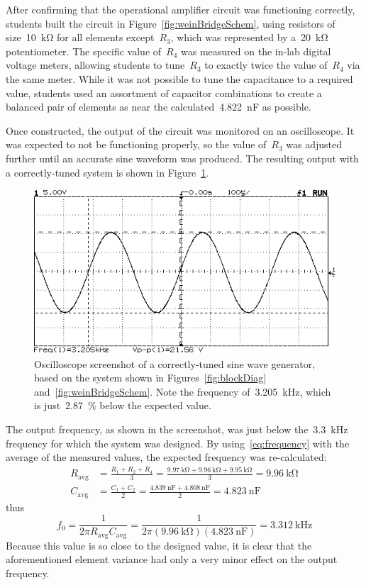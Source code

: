 After confirming that the operational amplifier circuit was functioning
correctly, students built the circuit in Figure~\ref{fig:weinBridgeSchem},
using resistors of size~\SI{10}{\kilo\ohm} for all elements except~$R_3$, which
was represented by a~\SI{20}{\kilo\ohm} potentiometer.  The specific value
of~$R_4$ was measured on the in-lab digital voltage meters, allowing students
to tune~$R_3$ to exactly twice the value of~$R_4$ via the same meter.  While it
was not possible to tune the capacitance to a required value, students used an
assortment of capacitor combinations to create a balanced pair of elements as
near the calculated~\SI{4.822}{\nano\farad} as possible.

Once constructed, the output of the circuit was monitored on an oscilloscope.
It was expected to not be functioning properly, so the value of~$R_3$ was
adjusted further until an accurate sine waveform was produced.  The resulting
output with a correctly-tuned system is shown in Figure~\ref{fig:goodShot}.
%
\begin{figure}[H]
	\centering
	\includegraphics[width=.6\textwidth]{img/shot/pt2shot.png}
	\parbox{.6\textwidth}{
	\caption[Oscilloscope Screenshot --- Functioning System]{Oscilloscope
	screenshot of a correctly-tuned sine wave generator, based on the system
	shown in Figures~\ref{fig:blockDiag} and~\ref{fig:weinBridgeSchem}.  Note
	the frequency of~\SI{3.205}{\kilo\hertz}, which is just~\SI{2.87}{\percent}
	below the expected value.}
	\label{fig:goodShot}}
\end{figure}
%
The output frequency, as shown in the screenshot, was just below
the~\SI{3.3}{\kilo\hertz} frequency for which the system was designed.  By
using~\eqref{eq:frequency} with the average of the measured values, the
expected frequency was re-calculated:
%
\begin{align*}
	R_\text{avg} &= \frac{R_1 + R_2 + R_4}{3}
	             = \frac{\SI{9.97}{\kilo\ohm} + \SI{9.96}{\kilo\ohm} + \SI{9.95}{\kilo\ohm}}{3}
				 = \SI{9.96}{\kilo\ohm}\\
	C_\text{avg} &= \frac{C_1 + C_2}{2}
				 = \frac{\SI{4.839}{\nano\farad} + \SI{4.808}{\nano\farad}}{2}
				 = \SI{4.823}{\nano\farad}
\end{align*}
thus
\begin{equation*}
	f_0 = \frac{1}{2 \pi R_\text{avg} C_\text{avg}}
		= \frac{1}{2 \pi (\SI{9.96}{\kilo\ohm}) (\SI{4.823}{\nano\farad})}
		= \SI{3.312}{\kilo\hertz}
\end{equation*}
%
Because this value is so close to the designed value, it is clear that the
aforementioned element variance had only a very minor effect on the output
frequency.

